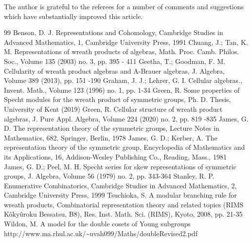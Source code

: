 \documentclass[10pt]{article}
\theoremstyle{definition}
\providecommand{\longthanks}[1]{\par\smallskip\noindent #1\par\smallskip}
\begin{document}
\longthanks{The author is grateful to the referees for a number of comments and suggestions which have substantially improved this article.}

\begin{thebibliography}{99}
Benson, D. J. Representations and Cohomology, Cambridge Studies in Advanced Mathematics, 1, Cambridge University Press, 1991
Chuang, J.; Tan, K. M. Representations of wreath products of algebras, Math. Proc. Camb. Philos. Soc., Volume 135 (2003) no. 3, pp. 395 - 411
Geetha, T.; Goodman, F. M. Cellularity of wreath product algebras and A-Brauer algebras, J. Algebra, Volume 389 (2013), pp. 151 -190
Graham, J. J.; Lehrer, G. I. Cellular algebras., Invent. Math., Volume 123 (1996) no. 1, pp. 1-34
Green, R. Some properties of Specht modules for the wreath product of symmetric groups, Ph. D. Thesis, University of Kent (2019)
Green, R. Cellular structure of wreath product algebras, J. Pure Appl. Algebra, Volume 224 (2020) no. 2, pp. 819 -835
James, G. D. The representation theory of the symmetric groups, Lecture Notes in Mathematics, 682, Springer, Berlin, 1978
James, G. D.; Kerber, A. The representation theory of the symmetric group, Encyclopedia of Mathematics and its Applications, 16, Addison-Wesley Publishing Co., Reading, Mass., 1981
James, G. D.; Peel, M. H. Specht series for skew representations of symmetric groups, J. Algebra, Volume 56 (1979) no. 2, pp. 343-364
Stanley, R. P. Enumerative Combinatorics, Cambridge Studies in Advanced Mathematics, 2, Cambridge University Press, 1999
Tsuchioka, S. A modular branching rule for wreath products, Combinatorial representation theory and related topics (RIMS Kôkyûroku Bessatsu, B8), Res. Inst. Math. Sci. (RIMS), Kyoto, 2008, pp. 21-35
Wildon, M. A model for the double cosets of Young subgroups http://www.ma.rhul.ac.uk/\textasciitilde{}uvah099/Maths/doubleRevised2.pdf
\end{thebibliography}
\end{document}
